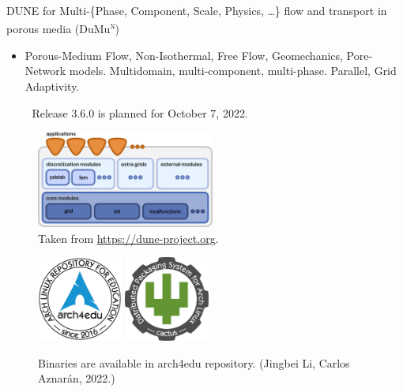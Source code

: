 \begin{frame}
\begin{alertblock}{DUNE for Multi-\{Phase, Component, Scale, Physics, \ldots\} flow and transport in porous media (DuMu\textsuperscript{x})}
\begin{itemize}
			      {🎉}
			      DUNE Release 2.9.0 is planned for end of October 2022.

			\item

			      Porous-Medium Flow, Non-Isothermal, Free Flow, Geomechanics, Pore-Network models.
			      Multidomain, multi-component, multi-phase. Parallel, Grid Adaptivity.

				      {🎉}
			      Release 3.6.0 is planned for October 7, 2022.

		\end{itemize}
	\end{alertblock}

	\begin{minipage}{0.45\textwidth}
		\begin{figure}[ht!]
			\centering
			\includegraphics[height=3.2cm]{dunedesign}
			\caption{Taken from \url{https://dune-project.org}.}
		\end{figure}
	\end{minipage}
	\begin{minipage}{0.45\textwidth}
		\begin{figure}[ht!]
			\centering %
			\href{https://github.com/arch4edu/arch4edu}{\includegraphics[height=2.8cm]{arch4edu}}\quad\quad %
			\href{https://github.com/arch4edu/cactus}{\includegraphics[height=2.8cm]{cactus.png}}
			\caption{Binaries are available in arch4edu repository. (Jingbei Li, Carlos Aznarán, 2022.)}
		\end{figure}
	\end{minipage}

\end{frame}

